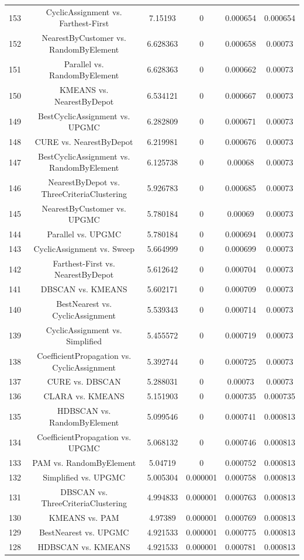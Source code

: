 \documentclass[a4paper,10pt]{article}
\begin{document}
\begin{landscape}
\begin{table}[!htp]
\begin{tabular}{cccccc}
153&CyclicAssignment vs. Farthest-First&7.15193&0&0.000654&0.000654\\
152&NearestByCustomer vs. RandomByElement&6.628363&0&0.000658&0.00073\\
151&Parallel vs. RandomByElement&6.628363&0&0.000662&0.00073\\
150&KMEANS vs. NearestByDepot&6.534121&0&0.000667&0.00073\\
149&BestCyclicAssignment vs. UPGMC&6.282809&0&0.000671&0.00073\\
148&CURE vs. NearestByDepot&6.219981&0&0.000676&0.00073\\
147&BestCyclicAssignment vs. RandomByElement&6.125738&0&0.00068&0.00073\\
146&NearestByDepot vs. ThreeCriteriaClustering&5.926783&0&0.000685&0.00073\\
145&NearestByCustomer vs. UPGMC&5.780184&0&0.00069&0.00073\\
144&Parallel vs. UPGMC&5.780184&0&0.000694&0.00073\\
143&CyclicAssignment vs. Sweep&5.664999&0&0.000699&0.00073\\
142&Farthest-First vs. NearestByDepot&5.612642&0&0.000704&0.00073\\
141&DBSCAN vs. KMEANS&5.602171&0&0.000709&0.00073\\
140&BestNearest vs. CyclicAssignment&5.539343&0&0.000714&0.00073\\
139&CyclicAssignment vs. Simplified&5.455572&0&0.000719&0.00073\\
138&CoefficientPropagation vs. CyclicAssignment&5.392744&0&0.000725&0.00073\\
137&CURE vs. DBSCAN&5.288031&0&0.00073&0.00073\\
136&CLARA vs. KMEANS&5.151903&0&0.000735&0.000735\\
135&HDBSCAN vs. RandomByElement&5.099546&0&0.000741&0.000813\\
134&CoefficientPropagation vs. UPGMC&5.068132&0&0.000746&0.000813\\
133&PAM vs. RandomByElement&5.04719&0&0.000752&0.000813\\
132&Simplified vs. UPGMC&5.005304&0.000001&0.000758&0.000813\\
131&DBSCAN vs. ThreeCriteriaClustering&4.994833&0.000001&0.000763&0.000813\\
130&KMEANS vs. PAM&4.97389&0.000001&0.000769&0.000813\\
129&BestNearest vs. UPGMC&4.921533&0.000001&0.000775&0.000813\\
128&HDBSCAN vs. KMEANS&4.921533&0.000001&0.000781&0.000813\\

\end{tabular}
\end{table}
\end{landscape}
\end{document}
